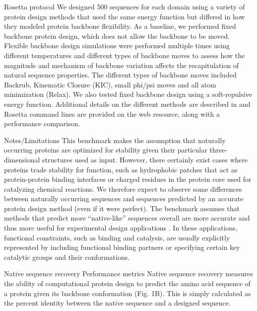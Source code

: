Rosetta protocol
We designed 500 sequences for each domain using a variety of protein design methods that used the same energy function but differed in how they modeled protein backbone flexibility. As a baseline, we performed fixed backbone protein design, which does not allow the backbone to be moved. Flexible backbone design simulations were performed multiple times using different temperatures and different types of backbone moves to assess how the magnitude and mechanism of backbone variation affects the recapitulation of natural sequence properties. The different types of backbone moves included Backrub, Kinematic Closure (KIC), small phi/psi moves and all atom minimization (Relax). We also tested fixed backbone design using a soft-repulsive energy function. Additional details on the different methods are described in \cite{ollikainen_computational_2013} and Rosetta command lines are provided on the web resource, along with a performance comparison.

Notes/Limitations
This benchmark makes the assumption that naturally occurring proteins are optimized for stability given their particular three-dimensional structures used as input. However, there certainly exist cases where proteins trade stability for function, such as hydrophobic patches that act as protein-protein binding interfaces or charged residues in the protein core used for catalyzing chemical reactions. We therefore expect to observe some differences between naturally occurring sequences and sequences predicted by an accurate protein design method (even if it were perfect). The benchmark assumes that methods that predict more “native-like” sequences overall are more accurate and thus more useful for experimental design applications \cite{kuhlman_native_2000}. In these applications, functional constraints, such as binding and catalysis, are usually explicitly represented by including functional binding partners or specifying certain key catalytic groups and their conformations.

Native sequence recovery
Performance metrics
Native sequence recovery \cite{kuhlman_native_2000} measures the ability of computational protein design to predict the amino acid sequence of a protein given its backbone conformation (Fig. 1B). This is simply calculated as the percent identity between the native sequence and a designed sequence.

